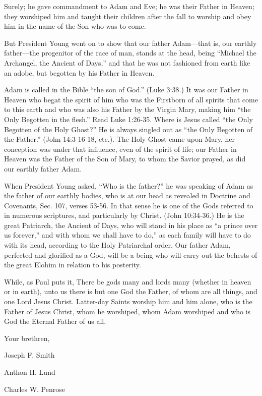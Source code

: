Surely; he gave commandment to Adam and Eve; he was their Father in Heaven; they
worshiped him and taught their children after the fall to worship and obey him in the name of
the Son who was to come.

But President Young went on to show that our father Adam—that is, our earthly father—the
progenitor of the race of man, stands at the head, being ``Michael the Archangel, the Ancient
of Days,'' and that he was not fashioned from earth like an adobe, but begotten by his Father
in Heaven.

Adam is called in the Bible ``the son of God.'' (Luke 3:38.) It was our Father in Heaven who
begat the spirit of him who was the Firstborn of all spirits that come to this earth and who
was also his Father by the Virgin Mary, making him ``the Only Begotten in the flesh.'' Read
Luke 1:26-35. Where is Jesus called ``the Only Begotten of the Holy Ghost?'' He is always
singled out as ``the Only Begotten of the Father.'' (John 14:3-16-18, etc.). The Holy Ghost
came upon Mary, her conception was under that influence, even of the spirit of life; our
Father in Heaven was the Father of the Son of Mary, to whom the Savior prayed, as did our
earthly father Adam.

When President Young asked, ``Who is the father?'' he was speaking of Adam as the father of
our earthly bodies, who is at our head as revealed in Doctrine and Covenants, Sec. 107,
verses 53-56. In that sense he is one of the Gods referred to in numerous scriptures, and
particularly by Christ. (John 10:34-36.) He is the great Patriarch, the Ancient of Days, who
will stand in his place as ``a prince over us forever,'' and with whom we shall have to do,'' as
each family will have to do with its head, according to the Holy Patriarchal order. Our father
Adam, perfected and glorified as a God, will be a being who will carry out the behests of the
great Elohim in relation to his posterity.

While, as Paul puts it, There be gods many and lords many (whether in heaven or in earth),
unto us there is but one God the Father, of whom are all things, and one Lord Jesus Christ.
Latter-day Saints worship him and him alone, who is the Father of Jesus Christ, whom he
worshiped, whom Adam worshiped and who is God the Eternal Father of us all.

Your brethren,

Joseph F. Smith

Anthon H. Lund

Charles W. Penrose

